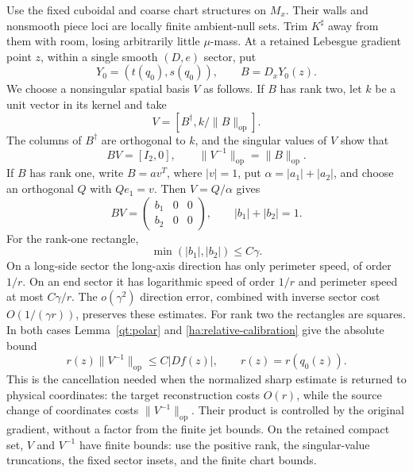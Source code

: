 Use the fixed cuboidal and coarse chart structures on $M_x$.
Their walls and nonsmooth piece loci are locally finite ambient-null
sets.  Trim $K^\sharp$ away from them with room, losing arbitrarily
little $\mu$-mass.  At a retained Lebesgue gradient point $z$, within
a single smooth $(D,e)$ sector, put
\begin{equation}\label{ha:Y0}
              Y_0=(t(q_0),s(q_0)),\qquad B=D_xY_0(z).
\end{equation}
We choose a nonsingular spatial basis $V$ as follows.  If $B$ has
rank two, let $k$ be a unit vector in its kernel and take
\[
                    V=[B^\dagger,k/\|B\|_{\mathrm{op}}].
\]
The columns of $B^\dagger$ are orthogonal to $k$, and the singular
values of $V$ show that
\begin{equation}\label{ha:rank-two-basis}
             BV=[I_2,0],\qquad
             \|V^{-1}\|_{\mathrm{op}}=\|B\|_{\mathrm{op}}.
\end{equation}
If $B$ has rank one, write $B=a v^T$, where $|v|=1$, put
$\alpha=|a_1|+|a_2|$, and choose an orthogonal $Q$ with $Qe_1=v$.
Then $V=Q/\alpha$ gives
\begin{equation}\label{ha:rank-one-basis}
 BV=\begin{pmatrix}b_1&0&0\\b_2&0&0\end{pmatrix},
 \qquad |b_1|+|b_2|=1.
\end{equation}
For the rank-one rectangle,
\begin{equation}\label{ha:b-small}
                        \min(|b_1|,|b_2|)\le C\gamma.
\end{equation}
On a long-side sector the long-axis direction has only perimeter
speed, of order $1/r$.  On an end sector it has logarithmic speed
of order $1/r$ and perimeter speed at most $C\gamma/r$.  The
$o(\gamma^2)$ direction error, combined with inverse sector cost
$O(1/(\gamma r))$, preserves these estimates.  For rank two the
rectangles are squares.  In both cases Lemma~\ref{qt:polar} and
\eqref{ha:relative-calibration} give the absolute bound
\begin{equation}\label{ha:V-cancellation}
                r(z)\|V^{-1}\|_{\mathrm{op}}\le C|Df(z)|,
                \qquad r(z)=r(q_0(z)).
\end{equation}
This is the cancellation needed when the normalized sharp estimate
is returned to physical coordinates: the target reconstruction
costs $O(r)$, while the source change of coordinates costs
$\|V^{-1}\|_{\mathrm{op}}$.  Their product is controlled by the
original gradient, without a factor from the finite jet bounds.
On the retained compact set, $V$ and $V^{-1}$ have finite bounds:
use the positive rank, the singular-value truncations, the fixed
sector insets, and the finite chart bounds.

